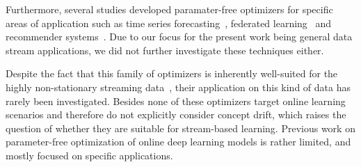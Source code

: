 \documentclass[letterpaper]{article} %
\begin{document}
Furthermore, several studies developed paramater-free optimizers for specific areas of application such as time series forecasting~\cite{miyaguchiCograConceptDriftAwareStochastic2019,fekriDeepLearningLoad2021, zhangPOLAOnlineTime2021a}, federated learning~\cite{canonacoAdaptiveFederatedLearning2021} and recommender systems~\cite{ferreirajoseADADRIFTAdaptiveLearning2020}.
Due to our focus for the present work being general data stream applications, we did not further investigate these techniques either.

Despite the fact that this family of optimizers is inherently well-suited for the highly non-stationary streaming data~\cite{schaulNoMorePesky2013}, their application on this kind of data has rarely been investigated.
Besides \citet{schaulNoMorePesky2013} none of these optimizers target online learning scenarios and therefore do not explicitly consider concept drift, which raises the question of whether they are suitable for stream-based learning.
Previous work on parameter-free optimization of online deep learning models is rather limited, and mostly focused on specific applications.
\end{document}
